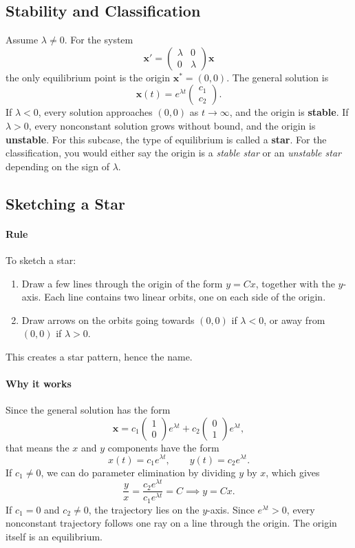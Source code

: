 \documentclass[11pt,letterpaper]{article}
\begin{document}
\subsection{Stability and Classification}
Assume $\lambda\ne0$. For the system 
$$
    \textbf{x}' = \begin{pmatrix}
        \lambda & 0\\
        0 & \lambda 
    \end{pmatrix}\textbf{x}
$$
the only equilibrium point is the origin $\textbf{x}^*=(0,0)$. The general solution is
\[
\mathbf{x}(t)=e^{\lambda t}\begin{pmatrix}c_1\\c_2\end{pmatrix}.
\]
If $\lambda<0$, every solution approaches $(0,0)$ as $t\to\infty$, and the origin is \textbf{stable}. If $\lambda>0$, every nonconstant solution grows without bound, and the origin is \textbf{unstable}. For this subcase, the type of equilibrium is called a \textbf{star}. For the classification, you would either say the origin is a \textit{stable star} or an \textit{unstable star} depending on the sign of $\lambda$.


\subsection{Sketching a Star}

\paragraph{Rule} To sketch a star:
\begin{enumerate}
    \item Draw a few lines through the origin of the form $y=Cx$, together with the $y$-axis. Each line contains two linear orbits, one on each side of the origin. 
    \item Draw arrows on the orbits going towards $(0,0)$ if $\lambda<0$, or away from $(0,0)$ if $\lambda>0$.
\end{enumerate}
This creates a star pattern, hence the name.

\paragraph{Why it works}
Since the general solution has the form
$$
\mathbf{x}=c_1 \begin{pmatrix}
    1\\0
\end{pmatrix} e^{\lambda    t} + c_2 \begin{pmatrix}
    0\\1
\end{pmatrix}e^{\lambda t},
$$
that means the $x$ and $y$ components have the form 
\[
x(t)=c_1e^{\lambda    t},\qquad y(t)=c_2e^{\lambda t}.
\]
If $c_1\ne0$, we can do parameter elimination by dividing $y$ by $x$, which gives
$$
\frac{y}{x}=\frac{c_2 e^{\lambda t}}{c_1 e^{\lambda t}} = C \implies y=Cx.
$$
If $c_1=0$ and $c_2\ne0$, the trajectory lies on the $y$-axis. Since $e^{\lambda t}>0$, every nonconstant trajectory follows one ray on a line through the origin. The origin itself is an equilibrium.
\end{document}
